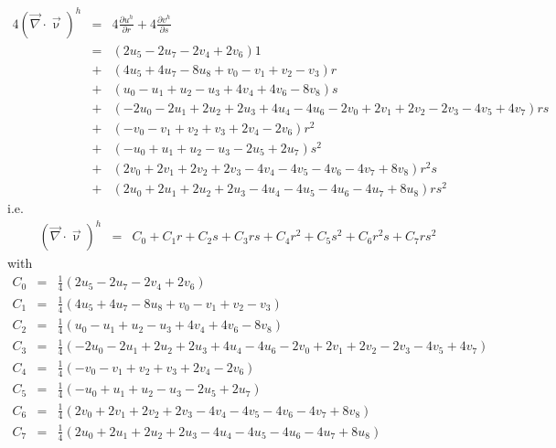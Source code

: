 \begin{eqnarray}
4(\vec\nabla\cdot\vec\upnu)^h 
&=& 4\frac{\partial u^h}{\partial r} + 4\frac{\partial v^h}{\partial s} \nonumber\\
&=& \left( 2u_5 -2u_7 -2v_4 +2v_6                                      \right) 1    \nonumber\\
&+& \left( 4u_5 +4u_7 -8u_8 +v_0 -v_1 +v_2 -v_3                        \right) r    \nonumber\\
&+& \left( u_0 -u_1 +u_2 -u_3 +4v_4 +4v_6 -8v_8                        \right) s    \nonumber\\
&+& \left( -2u_0 -2u_1 +2u_2 +2u_3 +4u_4 -4u_6 -2v_0 +2v_1 +2v_2 -2v_3 -4v_5 +4v_7   \right) rs   \nonumber\\
&+& \left( -v_0 -v_1 +v_2 +v_3 +2v_4 -2v_6                             \right) r^2  \nonumber\\
&+& \left( -u_0 + u_1 +u_2 -u_3 -2u_5 +2u_7                         \right) s^2  \nonumber\\
&+& \left( 2v_0 +2v_1 +2v_2 +2v_3 -4v_4 -4v_5 -4v_6 -4v_7 +8v_8        \right) r^2s \nonumber\\
&+& \left( 2u_0 +2u_1 +2u_2 +2u_3 -4u_4 -4u_5 -4u_6 -4u_7 +8u_8     \right) rs^2 \nonumber
\end{eqnarray}
i.e.
\begin{eqnarray}
(\vec\nabla\cdot\vec\upnu)^h 
&=& C_0 + C_1 r + C_2 s + C_3 rs + C_4 r^2 + C_5 s^2 + C_6 r^2s + C_7 rs^2 \label{eq:cviQ2raw}
\end{eqnarray}
with
\begin{eqnarray}
C_0 &=& \frac{1}{4}(2u_5 -2u_7 -2v_4 +2v_6)  \nonumber\\ 
C_1 &=& \frac{1}{4}( 4u_5 +4u_7 -8u_8 +v_0 -v_1 +v_2 -v_3  ) \nonumber\\ 
C_2 &=& \frac{1}{4}( u_0 -u_1 +u_2 -u_3 +4v_4 +4v_6 -8v_8  ) \nonumber\\
C_3 &=& \frac{1}{4}(  -2u_0 -2u_1 +2u_2 +2u_3 +4u_4 -4u_6 -2v_0 +2v_1 +2v_2 -2v_3 -4v_5 +4v_7  )   \nonumber \\ 
C_4 &=& \frac{1}{4}(-v_0 -v_1 +v_2 +v_3 +2v_4 -2v_6 )           \nonumber \\ 
C_5 &=& \frac{1}{4}(-u_0 + u_1 +u_2 -u_3 -2u_5 +2u_7   )           \nonumber \\ 
C_6 &=& \frac{1}{4}(  2v_0 +2v_1 +2v_2 +2v_3 -4v_4 -4v_5 -4v_6 -4v_7 +8v_8)     \nonumber   \\ 
C_7 &=& \frac{1}{4}(  2u_0 +2u_1 +2u_2 +2u_3 -4u_4 -4u_5 -4u_6 -4u_7 +8u_8  )     \nonumber 
\end{eqnarray}

